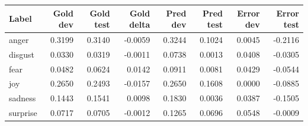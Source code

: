 \begin{tabular}{lrrrrrrr}
\toprule
Label & Gold dev & Gold test & Gold delta & Pred dev & Pred test & Error dev & Error test \\
\midrule
anger & 0.3199 & 0.3140 & -0.0059 & 0.3244 & 0.1024 & 0.0045 & -0.2116 \\
disgust & 0.0330 & 0.0319 & -0.0011 & 0.0738 & 0.0013 & 0.0408 & -0.0305 \\
fear & 0.0482 & 0.0624 & 0.0142 & 0.0911 & 0.0081 & 0.0429 & -0.0544 \\
joy & 0.2650 & 0.2493 & -0.0157 & 0.2650 & 0.1608 & 0.0000 & -0.0885 \\
sadness & 0.1443 & 0.1541 & 0.0098 & 0.1830 & 0.0036 & 0.0387 & -0.1505 \\
surprise & 0.0717 & 0.0705 & -0.0012 & 0.1265 & 0.0696 & 0.0548 & -0.0009 \\
\bottomrule
\end{tabular}
